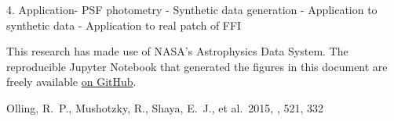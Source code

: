 \documentclass{rnaastex}
\begin{document}
4. Application- PSF photometry
  - Synthetic data generation
  - Application to synthetic data
  - Application to real patch of FFI





\acknowledgments

This research has made use of NASA's Astrophysics Data System.  The reproducible Jupyter Notebook that generated the figures in this document are freely available \href{https://github.com/gully/quigly}{on GitHub}.

\begin{thebibliography}{}

 Olling, R.~P., Mushotzky, R., Shaya, E.~J., et al.\ 2015, \nat, 521, 332

\end{thebibliography}
\end{document}
